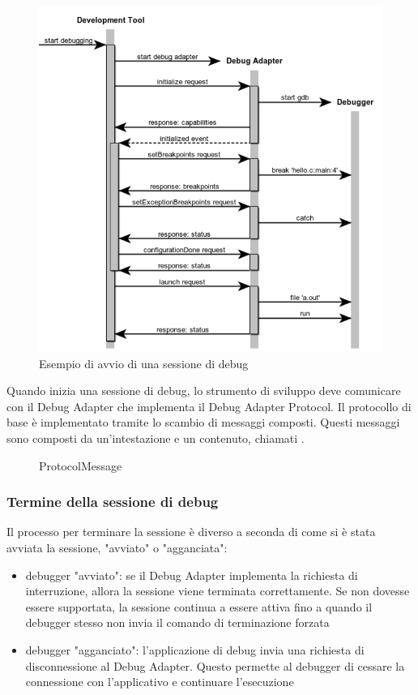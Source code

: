 \begin{figure}[H]    
    \centering
    \includegraphics[width=0.7\columnwidth]{images/init-launch.png}
    \caption{Esempio di avvio di una sessione di debug\cite{DAP}}
\end{figure}

Quando inizia una sessione di debug, lo strumento di sviluppo deve comunicare con il Debug Adapter che implementa il Debug Adapter Protocol. Il protocollo di base è implementato tramite lo scambio di messaggi composti. Questi messaggi sono composti da un'intestazione e un contenuto, chiamati . 
\begin{figure}[H]
    
    \caption{ProtocolMessage\cite{DAPmessage}}
\end{figure}

\subsubsection*{Termine della sessione di debug}

Il processo per terminare la sessione è diverso a seconda di come si è stata avviata la sessione, "avviato" o "agganciata":

\begin{itemize}
    \item {
        debugger "avviato": se il Debug Adapter implementa la richiesta di interruzione, allora la sessione viene terminata correttamente. Se non dovesse essere supportata, la sessione continua a essere attiva fino a quando il debugger stesso non invia il comando di terminazione forzata
    }
    \item {
        debugger "agganciato": l'applicazione di debug  invia una richiesta di disconnessione al Debug Adapter. Questo permette al debugger di cessare la connessione con l'applicativo e continuare l'esecuzione
    }
\end{itemize}

